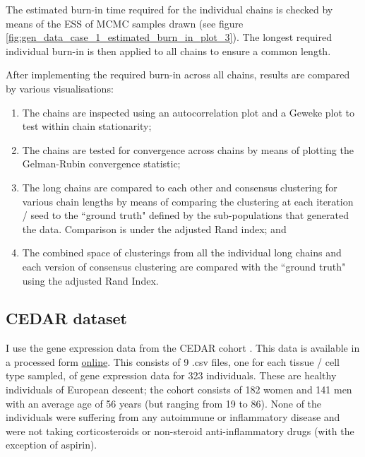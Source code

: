\documentclass[12pt]{article} %
\begin{document}
	The estimated burn-in time required for the individual chains is checked by means of the ESS of MCMC samples drawn (see figure \ref{fig:gen_data_case_1_estimated_burn_in_plot_3}). The longest required individual burn-in is then applied to all chains to ensure a common length.
	
	After implementing the required burn-in across all chains, results are compared by various visualisations:
	
	\begin{enumerate}
		\item The chains are inspected using an autocorrelation plot and a Geweke plot to test within chain stationarity;
		\item The chains are tested for convergence across chains by means of plotting the Gelman-Rubin convergence statistic;
		\item The long chains are compared to each other and consensus clustering for various chain lengths by means of comparing the clustering at each iteration / seed to the ``ground truth" defined by the sub-populations that generated the data. Comparison is under the adjusted Rand index; and
		\item The combined space of clusterings from all the individual long chains and each version of consensus clustering are compared with the ``ground truth" using the adjusted Rand Index.
	\end{enumerate}
	
	
	\subsection{CEDAR dataset}
	I use the gene expression data from the CEDAR cohort \citep{TheInternationalIBDGeneticsConsortiumIBDriskloci2018}. This data is available in a processed form \href{http://139.165.108.18/srv/genmol/permanent/1be6993fe41c12a051c9244d67c91da2be49e5dd26a6cd79f442bc006971e2ef/crohn-index.html}{online}. This consists of 9 .csv files, one for each tissue / cell type sampled, of gene expression data for 323 individuals. These are healthy individuals of European descent; the cohort consists of 182 women and 141 men with an average age of 56 years (but ranging from 19 to 86). None of the individuals were suffering from any autoimmune or inflammatory disease and were not taking corticosteroids or non-steroid anti-inflammatory drugs (with the exception of aspirin). 
	
\end{document}
